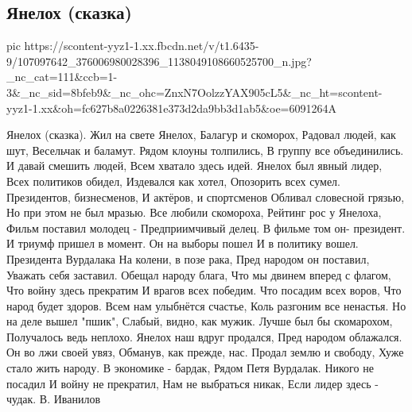  
 
 
 
 

\subsection{Янелох (сказка)}

\ifcmt
  pic https://scontent-yyz1-1.xx.fbcdn.net/v/t1.6435-9/107097642_376006980028396_1138049108660525700_n.jpg?_nc_cat=111&ccb=1-3&_nc_sid=8bfeb9&_nc_ohc=ZnxN7OolzzYAX905cL5&_nc_ht=scontent-yyz1-1.xx&oh=fc627b8a0226381e373d2da9bb3d1ab5&oe=6091264A
\fi

Янелох (сказка).
Жил на свете Янелох,
Балагур и скоморох,
Радовал людей, как шут, 
Весельчак и баламут.
Рядом клоуны толпились,
В группу все объединились.
И давай смешить людей,
Всем хватало здесь идей.
Янелох был явный лидер,
Всех политиков обидел,
Издевался как хотел,
Опозорить всех сумел.
Президентов, бизнесменов,
И актёров, и спортсменов
Обливал словесной грязью,
Но при этом не был мразью.
Все любили скомороха,
Рейтинг рос у Янелоха,
Фильм поставил молодец -
Предприимчивый делец.
В фильме том он- президент.
И триумф пришел в момент.
Он на выборы пошел
И в политику вошел.
Президента Вурдалака 
На колени, в позе рака,
Пред народом он поставил,
Уважать себя заставил.
Обещал народу блага,
Что мы двинем вперед с флагом,
Что войну здесь прекратим
И врагов всех победим.
Что посадим всех воров,
Что народ будет здоров.
Всем нам улыбнётся счастье,
Коль разгоним все ненастья.
Но на деле вышел "пшик",
Слабый, видно, как мужик.
Лучше был бы скомарохом,
Получалось ведь неплохо.
Янелох наш вдруг продался,
Пред народом облажался.
Он во лжи своей увяз,
Обманув, как прежде, нас.
Продал землю и свободу,
Хуже стало жить народу.
В экономике - бардак,
Рядом Петя Вурдалак.
Никого не посадил
И войну не прекратил,
Нам не выбраться никак,
Если лидер здесь - чудак.
В. Иванилов

